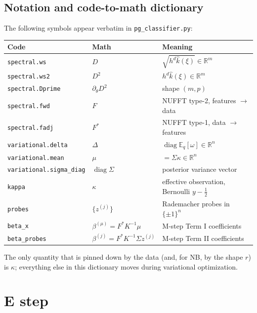 \documentclass{article}
\newcommand{\R}{\mathbb{R}}
\newcommand{\E}{\mathbb{E}}
\DeclareMathOperator{\diag}{diag}
\begin{document}
\subsection{Notation and code-to-math dictionary}
\label{sec:notation}
The following symbols appear verbatim in \texttt{pg\_classifier.py}:
\begin{center}
\begin{tabular}{@{}l l l@{}}
\toprule
\textbf{Code} & \textbf{Math} & \textbf{Meaning}\\
\midrule
\texttt{spectral.ws}        & $D$                  & $\sqrt{h^{d}\hat k(\xi)}\in\R^{m}$\\
\texttt{spectral.ws2}       & $D^{2}$              & $h^{d}\hat k(\xi)\in\R^{m}$\\
\texttt{spectral.Dprime}    & $\partial_\theta D^{2}$ & shape $(m,p)$\\
\texttt{spectral.fwd}       & $F$                  & NUFFT type-2, features $\to$ data\\
\texttt{spectral.fadj}      & $F^{*}$              & NUFFT type-1, data $\to$ features\\
\texttt{variational.delta}  & $\Delta$             & $\diag\E_q[\omega]\in\R^{n}$\\
\texttt{variational.mean}   & $\mu$                & $=\Sigma\kappa\in\R^{n}$\\
\texttt{variational.sigma\_diag} & $\diag\Sigma$  & posterior variance vector\\
\texttt{kappa}              & $\kappa$             & effective observation, Bernoulli $y-\tfrac12$\\
\texttt{probes}             & $\{z^{(j)}\}$        & Rademacher probes in $\{\pm1\}^{n}$\\
\texttt{beta\_x}            & $\beta^{(\mu)}=F^{*}K^{-1}\mu$ & M-step Term I coefficients\\
\texttt{beta\_probes}       & $\beta^{(j)}=F^{*}K^{-1}\Sigma z^{(j)}$ & M-step Term II coefficients\\
\bottomrule
\end{tabular}
\end{center}
The only quantity that is pinned down by the data (and, for NB, by the shape $r$) is $\kappa$; everything else in this dictionary moves during variational optimization.

\section{E step}
\label{sec:estep}
\end{document}

